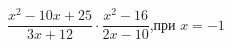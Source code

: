 \begin{ex}[type=simplify_calculate]
	\begin{condition}
		\( \dfrac{x^2-10x+25}{3x+12}\cdot\dfrac{x^2-16}{2x-10} \),\quad при \( x=-1 \)
	\end{condition}
\end{ex}